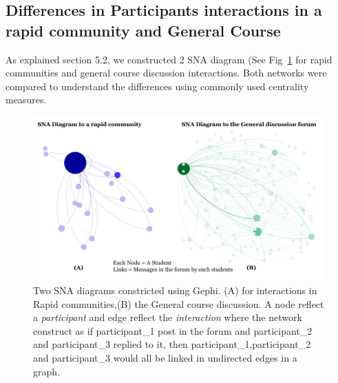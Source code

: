 \documentclass[manuscript,screen,review]{acmart}
\begin{document}
\subsection{Differences in Participants interactions in a rapid community and General Course}

As explained section 5.2, we constructed 2 SNA diagram (See Fig~\ref{fig:SNA} for rapid communities and general course discussion interactions. Both networks were compared to understand the differences using commonly used centrality measures.   

\begin{figure}[h]
  \centering
  \includegraphics[width=\linewidth]{images/SNA Diagrams.png}
  \caption{Two SNA diagrams constricted using Gephi. (A) for interactions in Rapid communities,(B) the General course discussion.  A node reflect a \textit{participant} and edge reflect the \textit{interaction} where the network construct as if participant\_1 post in the forum and participant\_2 and participant\_3 replied to it, then participant\_1,participant\_2 and participant\_3 would all be linked in undirected edges in a graph.}
 \label{fig:SNA}
\end{figure}
\end{document}
